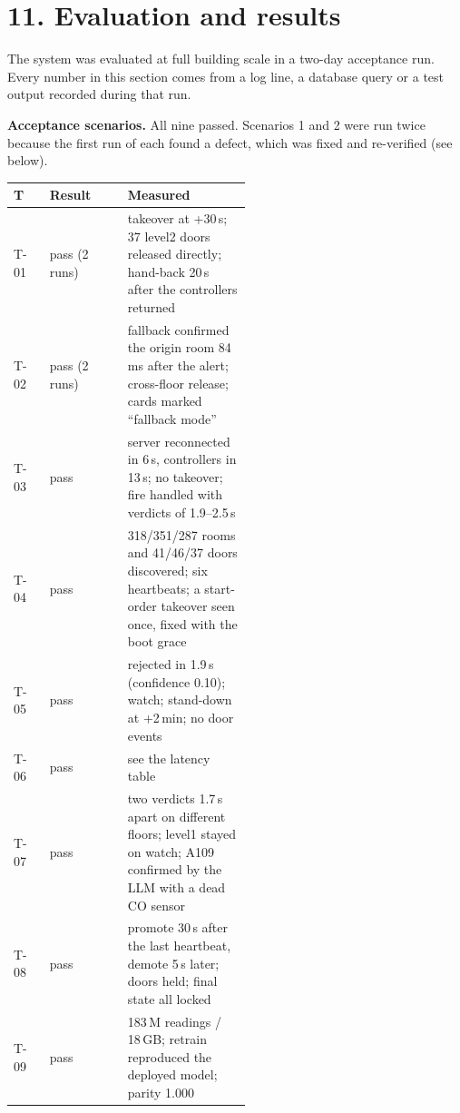 \documentclass[11pt]{article}
\begin{document}
\section{11. Evaluation and results}

The system was evaluated at full building scale in a two-day acceptance run. Every number in 
this section comes from a log line, a database query or a test output recorded during that run.

\textbf{Acceptance scenarios.} All nine passed. Scenarios 1 and 2 were run twice because the 
first run of each found a defect, which was fixed and re-verified (see below).

\begin{center}
\begin{tabular}{llp{0.52\linewidth}}
\toprule
\textbf{T} & \textbf{Result} & \textbf{Measured} \\
\midrule
T-01 & pass (2 runs) & takeover at +30\,s; 37 level2 doors released directly; hand-back 20\,s after the controllers returned \\
T-02 & pass (2 runs) & fallback confirmed the origin room 84\,ms after the alert; cross-floor release; cards marked ``fallback mode'' \\
T-03 & pass & server reconnected in 6\,s, controllers in 13\,s; no takeover; fire handled with verdicts of 1.9--2.5\,s \\
T-04 & pass & 318/351/287 rooms and 41/46/37 doors discovered; six heartbeats; a start-order takeover seen once, fixed with the boot grace \\
T-05 & pass & rejected in 1.9\,s (confidence 0.10); watch; stand-down at +2\,min; no door events \\
T-06 & pass & see the latency table \\
T-07 & pass & two verdicts 1.7\,s apart on different floors; level1 stayed on watch; A109 confirmed by the LLM with a dead CO sensor \\
T-08 & pass & promote 30\,s after the last heartbeat, demote 5\,s later; doors held; final state all locked \\
T-09 & pass & 183\,M readings / 18\,GB; retrain reproduced the deployed model; parity 1.000 \\
\bottomrule
\end{tabular}
\end{center}
\end{document}
